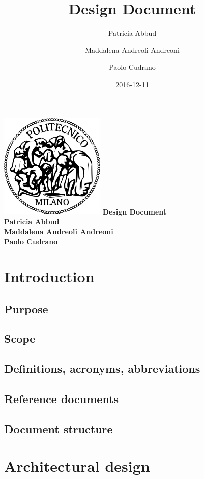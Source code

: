 \documentclass[12pt, a4paper]{article}
\title{Design Document}
\date{2016-12-11}
\author{
	Patricia Abbud
	\and
	Maddalena Andreoli Andreoni
	\and
	Paolo Cudrano
}
\begin{document}
	\begin{titlepage}
		\centering
		\includegraphics[width=5cm]{img/polimi_logo.png} %
		\vfill
		{\bfseries\Large
			Design Document\\
			\vskip4cm
			Patricia Abbud\\
			Maddalena Andreoli Andreoni\\
			Paolo Cudrano\\
		}
		\vfill
		\vfill
	\end{titlepage}

	\tableofcontents
	\newpage

	\section{Introduction}
		\subsection{Purpose}

		\subsection{Scope}

		\subsection{Definitions, acronyms, abbreviations}

		\subsection{Reference documents}

		\subsection{Document structure}

	\section{Architectural design}
\end{document}
